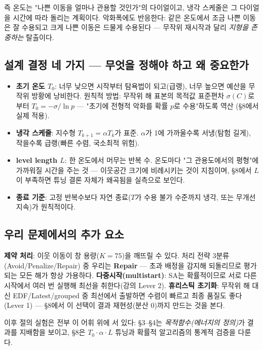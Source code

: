 \documentclass[11pt]{article}
\begin{document}
즉 온도는 "나쁜 이동을 얼마나 관용할 것인가"의 다이얼이고,
냉각 스케줄은 그 다이얼을 시간에 따라 돌리는 계획이다.
악화폭에도 반응한다: 같은 온도에서 조금 나쁜 이동은 잘 수용되고 크게 나쁜 이동은 드물게 수용된다 —
무작위 재시작과 달리 \emph{지형을 존중하는} 탈출이다.

\subsection{설계 결정 네 가지 — 무엇을 정해야 하고 왜 중요한가}

\begin{itemize}[nosep]
  \item \textbf{초기 온도 $T_0$}: 너무 낮으면 시작부터 탐욕법이 되고(급랭), 너무 높으면 예산을 무작위 방황에 낭비한다.
        원칙적 방법: 무작위 해 표본의 목적값 표준편차 $\sigma(C)$로부터
        $T_0=-\sigma/\ln p$ — "초기에 전형적 악화를 확률 $p$로 수용"하도록 역산 (\S8에서 실제 적용).
  \item \textbf{냉각 스케줄}: 지수형 $T_{k+1}=\alpha T_k$가 표준. $\alpha$가 1에 가까울수록 서냉(탐험 길게),
        작을수록 급랭(빠른 수렴, 국소최적 위험).
  \item \textbf{level length $L$}: 한 온도에서 머무는 반복 수. 온도마다 "그 관용도에서의 평형"에
        가까워질 시간을 주는 것 — 이웃공간 크기에 비례시키는 것이 지침이며,
        \S8에서 $L$이 부족하면 튜닝 결론 자체가 왜곡됨을 실측으로 보인다.
  \item \textbf{종료 기준}: 고정 반복수보다 자연 종료($T$가 수용 불가 수준까지 냉각, 또는 무개선 지속)가 원칙적이다.
\end{itemize}

\subsection{우리 문제에서의 추가 요소}

\textbf{제약 처리}: 이웃 이동이 창 용량($K{=}75$)을 깨뜨릴 수 있다.
처리 전략 3분류(Avoid/Penalize/Repair) 중 우리는 \textbf{Repair} —
초과 배정을 감지해 되돌리므로 평가되는 모든 해가 항상 가용하다.
\textbf{다중시작(multistart)}: SA는 확률적이므로 서로 다른 시작에서 여러 번 실행해 최선을 취한다(강의 Lever 2).
\textbf{휴리스틱 초기화}: 무작위 해 대신 EDF/Latest/grouped 중 최선에서 출발하면
수렴이 빠르고 최종 품질도 좋다(Lever 1) — \S8에서 이 선택이 결과 재현성(분산 0)까지 만드는 것을 본다.

이후 절의 실험은 전부 이 어휘 위에 서 있다:
\S3--\S4는 \emph{목적함수(에너지의 정의)}가 결과를 지배함을 보이고,
\S8은 $T_0\cdot\alpha\cdot L$ 튜닝과 확률적 알고리즘의 통계적 검증을 다룬다.
\end{document}

